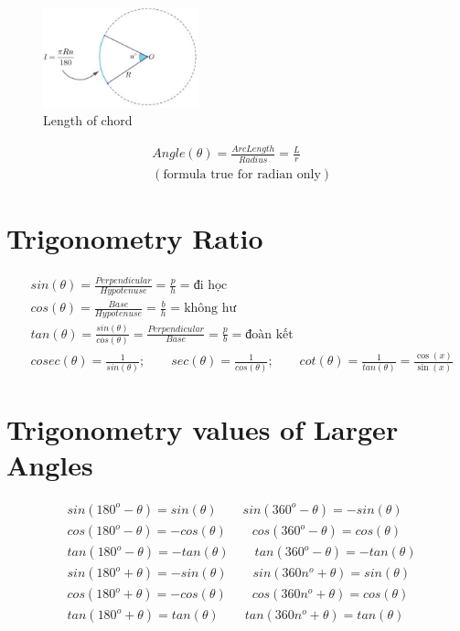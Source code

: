 \documentclass{article}
\begin{document}
\begin{figure}[H]
    \centering
    \caption{Length of chord}
    \includegraphics[width=0.4\textwidth]{chord_length.png}
\end{figure}

\begin{align*}
    &Angle(\theta) = \frac{Arc Length}{Radius} = \frac{L}{r} \\
    &(\text{formula true for radian only})
\end{align*}

\section{Trigonometry Ratio}
\begin{align*}
    &sin(\theta) = \frac{Perpendicular}{Hypotenuse} = \frac{p}{h} = \text{đi học} \\
    &cos(\theta) = \frac{Base}{Hypotenuse} = \frac{b}{h} = \text{không hư} \\
    &tan(\theta) = \frac{sin(\theta)}{cos(\theta)} = \frac{Perpendicular}{Base} = \frac{p}{b} = \text{đoàn kết} \\
    &cosec(\theta) = \frac{1}{sin(\theta)}; \qquad
    sec(\theta) = \frac{1}{cos(\theta)}; \qquad
    cot(\theta) = \frac{1}{tan(\theta)} = \frac{\cos(x)}{\sin(x)}
\end{align*}

\section{Trigonometry values of Larger Angles}
\begin{align*}
    &sin(180^o - \theta) = sin(\theta) \qquad sin(360^o - \theta) = -sin(\theta) \\
    &cos(180^o - \theta) = -cos(\theta) \qquad cos(360^o - \theta) = cos(\theta) \\
    &tan(180^o - \theta) = -tan(\theta) \qquad tan(360^o - \theta) = -tan(\theta) \\
    &sin(180^o + \theta) = -sin(\theta) \qquad sin(360n^o + \theta) = sin(\theta) \\
    &cos(180^o + \theta) = -cos(\theta) \qquad cos(360n^o + \theta) = cos(\theta) \\
    &tan(180^o + \theta) = tan(\theta) \qquad tan(360n^o + \theta) = tan(\theta)
\end{align*}
\end{document}
